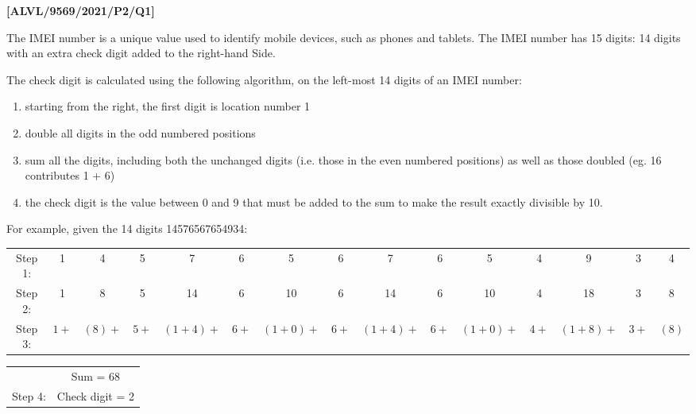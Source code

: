 \item \textbf{{[}ALVL/9569/2021/P2/Q1{]} }

The IMEI number is a unique value used to identify mobile devices,
such as phones and tablets. The IMEI number has 15 digits: 14 digits
with an extra check digit added to the right-hand Side. 

The check digit is calculated using the following algorithm, on the
left-most 14 digits of an IMEI number: 
\begin{enumerate}
\item starting from the right, the first digit is location number 1 
\item double all digits in the odd numbered positions 
\item sum all the digits, including both the unchanged digits (i.e. those
in the even numbered positions) as well as those doubled (eg. 16 contributes
1 + 6) 
\item the check digit is the value between 0 and 9 that must be added to
the sum to make the result exactly divisible by 10. 
\end{enumerate}
For example, given the 14 digits 14576567654934:

\begin{tabular}{ccccccccccccccc}
{\footnotesize{}Step 1:} & {\footnotesize{}1} & {\footnotesize{}4} & {\footnotesize{}5} & {\footnotesize{}7} & {\footnotesize{}6} & {\footnotesize{}5} & {\footnotesize{}6} & {\footnotesize{}7} & {\footnotesize{}6} & {\footnotesize{}5} & {\footnotesize{}4} & {\footnotesize{}9} & {\footnotesize{}3} & {\footnotesize{}4}\tabularnewline
{\footnotesize{}Step 2:} & {\footnotesize{}1} & {\footnotesize{}8} & {\footnotesize{}5} & {\footnotesize{}14} & {\footnotesize{}6} & {\footnotesize{}10} & {\footnotesize{}6} & {\footnotesize{}14} & {\footnotesize{}6} & {\footnotesize{}10} & {\footnotesize{}4} & {\footnotesize{}18} & {\footnotesize{}3} & {\footnotesize{}8}\tabularnewline
{\footnotesize{}Step 3:} & {\footnotesize{}$1+$} & {\footnotesize{}$(8)+$} & {\footnotesize{}$5+$} & {\footnotesize{}$(1+4)+$} & {\footnotesize{}$6+$} & {\footnotesize{}$(1+0)+$} & {\footnotesize{}$6+$} & {\footnotesize{}$(1+4)+$} & {\footnotesize{}$6+$} & {\footnotesize{}$(1+0)+$} & {\footnotesize{}$4+$} & {\footnotesize{}$(1+8)+$} & {\footnotesize{}$3+$} & {\footnotesize{}$(8)$}\tabularnewline
\end{tabular}

\begin{tabular}{cc}
 & {\footnotesize{}Sum = 68}\tabularnewline
{\footnotesize{}Step 4:} & {\footnotesize{}Check digit = 2}\tabularnewline
\end{tabular}

